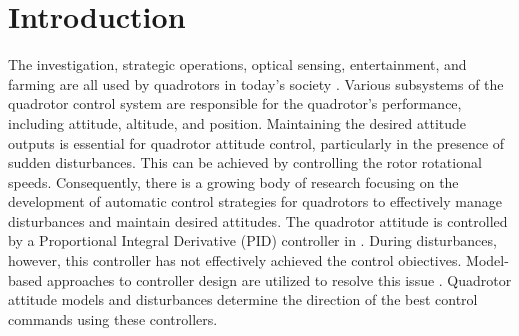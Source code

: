 \documentclass[3p,times]{elsarticle}
\begin{document}

\section{Introduction}\label{sec:intro}
The investigation, strategic operations, optical sensing, entertainment, and farming are all used by quadrotors in today's society \cite{drones5030059}.
Various subsystems of the quadrotor control system are responsible for the quadrotor's performance, including attitude, altitude, and position.
Maintaining the desired attitude outputs is essential for quadrotor attitude control, particularly in the presence of sudden disturbances. This can be achieved by controlling the rotor rotational speeds\cite{article_Sharifi}.
Consequently, there is a growing body of research focusing on the development of automatic control strategies for quadrotors to effectively manage disturbances and maintain desired attitudes.
The quadrotor attitude is controlled by a Proportional Integral Derivative (PID) controller in \cite{article_Bolandi,article_Abdul}.
During disturbances, however, this controller has not effectively achieved the control obiectives.
Model-based approaches to controller design are utilized to resolve this issue \cite{bouzid:hal-02543214,9275226}.
Quadrotor attitude models and disturbances determine the direction of the best control commands using these controllers.
\end{document}
